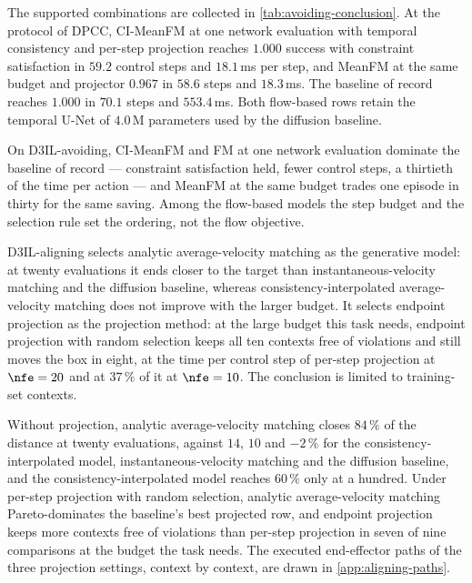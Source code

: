
The supported combinations are collected in \autoref{tab:avoiding-conclusion}. At the protocol of
\ac{DPCC}, CI-MeanFM at one network evaluation with temporal consistency and per-step projection
reaches $1.000$ success with constraint satisfaction in $59.2$ control steps and $18.1$\,ms per step,
and MeanFM at the same budget and projector $0.967$ in $58.6$ steps and $18.3$\,ms. The baseline of
record reaches $1.000$ in $70.1$ steps and $553.4$\,ms. Both flow-based rows retain the temporal U-Net
of $4.0$\,M parameters used by the diffusion baseline.

On D3IL-avoiding, CI-MeanFM and FM at one network evaluation dominate the baseline of record ---
constraint satisfaction held, fewer control steps, a thirtieth of the time per action --- and MeanFM at
the same budget trades one episode in thirty for the same saving. Among the flow-based models the step
budget and the selection rule set the ordering, not the flow objective.

D3IL-aligning selects analytic average-velocity matching as the generative model: at twenty evaluations
it ends closer to the target than instantaneous-velocity matching and the diffusion baseline, whereas
consistency-interpolated average-velocity matching does not improve with the larger budget. It selects
endpoint projection as the projection method: at the large budget this task needs, endpoint projection
with random selection keeps all ten contexts free of violations and still moves the box in eight, at the
time per control step of per-step projection at $\nfe=20$ and at $37\,\%$ of it at $\nfe=10$. The
conclusion is limited to training-set contexts.

Without projection, analytic average-velocity matching closes $84\,\%$ of the distance at twenty
evaluations, against $14$, $10$ and $-2\,\%$ for the consistency-interpolated model, instantaneous-velocity
matching and the diffusion baseline, and the consistency-interpolated model reaches $60\,\%$ only at a
hundred. Under per-step projection with random selection, analytic average-velocity matching
Pareto-dominates the baseline's best projected row, and endpoint projection keeps more contexts free of
violations than per-step projection in seven of nine comparisons at the budget the task needs. The executed end-effector paths of
the three projection settings, context by context, are drawn in \autoref{app:aligning-paths}.


